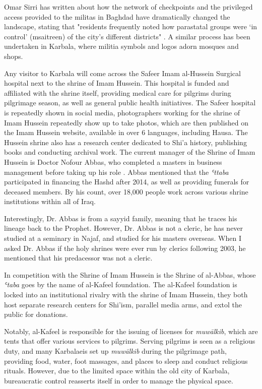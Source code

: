 Omar Sirri has written about how the network of checkpoints and the privileged access provided to the militas in Baghdad have dramatically changed the landscape, stating that "residents frequently noted how parastatal groups were ‘in control’ (msaitreen) of the city’s different districts" \cite[14]{omar_sirri_destructive_2021}. A similar process has been undertaken in Karbala, where militia symbols and logos adorn mosques and shops. 

Any visitor to Karbala will come across the Safeer Imam al-Hussein Surgical hospital next to the shrine of Imam Hussein. This hospital is funded and affiliated with the shrine itself, providing medical care for pilgrims during pilgrimage season, as well as general public health initiatives. The Safeer hospital is repeatedly shown in social media, photographers working for the shrine of Imam Hussein repeatedly show up to take photos, which are then published on the Imam Hussein website, available in over 6 languages, including Hausa. The Hussein shrine also has a research center dedicated to Shi'a history, publishing books and conducting archival work. The current manager of the Shrine of Imam Hussein is Doctor Nofour Abbas, who completed a masters in business management before taking up his role \cite{nofour_abbas_interview_2021}. Abbas mentioned that the \emph{ʿttaba} participated in financing the Hashd after 2014, as well as providing funerals for deceased members. By his count, over 18,000 people work across various shrine institutions within all of Iraq. 

Interestingly, Dr. Abbas is from a sayyid family, meaning that he traces his lineage back to the Prophet. However, Dr. Abbas is not a cleric, he has never studied at a seminary in Najaf, and studied for his masters overseas. When I asked Dr. Abbas if the holy shrines were ever run by clerics following 2003, he mentioned that his predacessor was not a cleric. 

In competition with the Shrine of Imam Hussein is the Shrine of al-Abbas, whose \emph{ʿtaba} goes by the name of al-Kafeel foundation. The al-Kafeel foundation is locked into an institutional rivalry with the shrine of Imam Hussein, they both host separate research centers for Shi'ism, parallel media arms, and extol the public for donations. 

Notably, al-Kafeel is responsible for the issuing of licenses for \emph{muwālkib}, which are tents that offer various services to pilgrims. Serving pilgrims is seen as a religious duty, and many Karbalaeis set up \emph{muwālkib} during the pilgrimage path, providing food, water, foot massages, and places to sleep and conduct religious rituals. However, due to the limited space within the old city of Karbala, bureaucratic control reasserts itself in order to manage the physical space. 

